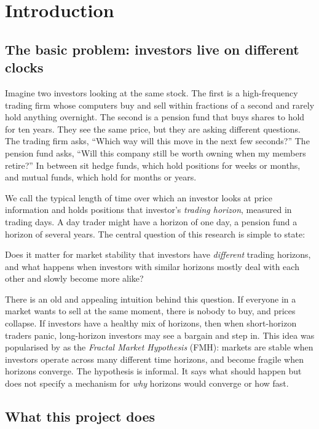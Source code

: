 \section{Introduction}
\label{sec:intro}

\subsection{The basic problem: investors live on different clocks}

Imagine two investors looking at the same stock. The first is a high-frequency trading firm whose computers buy and sell within fractions of a second and rarely hold anything overnight. The second is a pension fund that buys shares to hold for ten years. They see the same price, but they are asking different questions. The trading firm asks, ``Which way will this move in the next few seconds?'' The pension fund asks, ``Will this company still be worth owning when my members retire?'' In between sit hedge funds, which hold positions for weeks or months, and mutual funds, which hold for months or years.

We call the typical length of time over which an investor looks at price information and holds positions that investor's \emph{trading horizon}, measured in trading days. A day trader might have a horizon of one day, a pension fund a horizon of several years. The central question of this research is simple to state:

\begin{keyidea}
Does it matter for market stability that investors have \emph{different} trading horizons, and what happens when investors with similar horizons mostly deal with each other and slowly become more alike?
\end{keyidea}

There is an old and appealing intuition behind this question. If everyone in a market wants to sell at the same moment, there is nobody to buy, and prices collapse. If investors have a healthy mix of horizons, then when short-horizon traders panic, long-horizon investors may see a bargain and step in. This idea was popularised by \citet{peters1994} as the \emph{Fractal Market Hypothesis} (FMH): markets are stable when investors operate across many different time horizons, and become fragile when horizons converge. The hypothesis is informal. It says what should happen but does not specify a mechanism for \emph{why} horizons would converge or how fast.

\subsection{What this project does}

